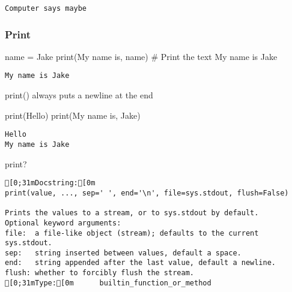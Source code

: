 \documentclass[
  letterpaper,
  DIV=11,
  numbers=noendperiod]{scrreprt}
\newenvironment{Shaded}{\begin{snugshade}}{\end{snugshade}}
\newcommand{\BuiltInTok}[1]{\textcolor[rgb]{0.00,0.46,0.62}{#1}}
\newcommand{\CommentTok}[1]{\textcolor[rgb]{0.37,0.37,0.37}{#1}}
\newcommand{\NormalTok}[1]{\textcolor[rgb]{0.00,0.46,0.62}{#1}}
\newcommand{\OperatorTok}[1]{\textcolor[rgb]{0.37,0.37,0.37}{#1}}
\newcommand{\StringTok}[1]{\textcolor[rgb]{0.13,0.47,0.30}{#1}}
\begin{document}
\begin{verbatim}
Computer says maybe
\end{verbatim}

\hypertarget{print}{%
\subsubsection{Print}\label{print}}

\begin{Shaded}
\begin{Highlighting}[]
\NormalTok{name }\OperatorTok{=} \StringTok{\textquotesingle{}Jake\textquotesingle{}}
\BuiltInTok{print}\NormalTok{(}\StringTok{\textquotesingle{}My name is\textquotesingle{}}\NormalTok{,           name) }\CommentTok{\# Print the text \textquotesingle{}My name is Jake\textquotesingle{}}
\end{Highlighting}
\end{Shaded}

\begin{verbatim}
My name is Jake
\end{verbatim}

print() always puts a newline at the end

\begin{Shaded}
\begin{Highlighting}[]
\BuiltInTok{print}\NormalTok{(}\StringTok{\textquotesingle{}Hello\textquotesingle{}}\NormalTok{) }
\BuiltInTok{print}\NormalTok{(}\StringTok{\textquotesingle{}My name is\textquotesingle{}}\NormalTok{, }\StringTok{\textquotesingle{}Jake\textquotesingle{}}\NormalTok{)}
\end{Highlighting}
\end{Shaded}

\begin{verbatim}
Hello
My name is Jake
\end{verbatim}

\begin{Shaded}
\begin{Highlighting}[]
\BuiltInTok{print}\NormalTok{?}
\end{Highlighting}
\end{Shaded}

\begin{verbatim}
[0;31mDocstring:[0m
print(value, ..., sep=' ', end='\n', file=sys.stdout, flush=False)

Prints the values to a stream, or to sys.stdout by default.
Optional keyword arguments:
file:  a file-like object (stream); defaults to the current sys.stdout.
sep:   string inserted between values, default a space.
end:   string appended after the last value, default a newline.
flush: whether to forcibly flush the stream.
[0;31mType:[0m      builtin_function_or_method
\end{verbatim}
\end{document}
